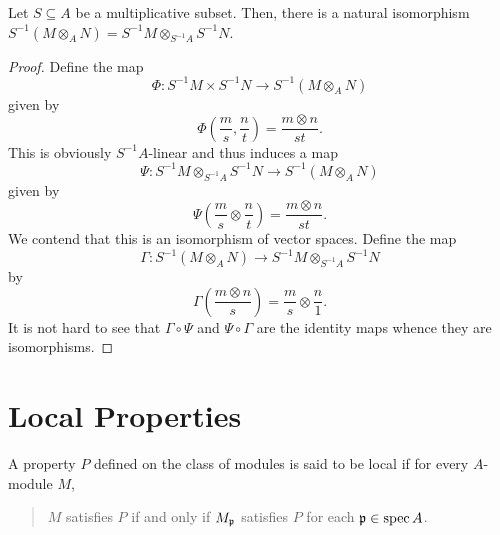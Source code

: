 \begin{proposition}
    Let $S\subseteq A$ be a multiplicative subset. Then, there is a natural isomorphism $S^{-1}(M\otimes_A N) = S^{-1}M\otimes_{S^{-1}A}S^{-1}N$.
\end{proposition}
\begin{proof}
    Define the map 
    \begin{equation*}
        \Phi: S^{-1}M\times S^{-1}N\to S^{-1}(M\otimes_A N) 
    \end{equation*}
    given by 
    \begin{equation*}
        \Phi\left(\frac{m}{s}, \frac{n}{t}\right) = \frac{m\otimes n}{st}.
    \end{equation*}
    This is obviously $S^{-1}A$-linear and thus induces a map 
    \begin{equation*}
        \Psi: S^{-1}M\otimes_{S^{-1}A} S^{-1}N\to S^{-1}(M\otimes_A N) 
    \end{equation*}
    given by 
    \begin{equation*}
        \Psi\left(\frac{m}{s}\otimes\frac{n}{t}\right) = \frac{m\otimes n}{st}.
    \end{equation*}
    We contend that this is an isomorphism of vector spaces. Define the map 
    \begin{equation*}
        \Gamma: S^{-1}(M\otimes_A N)\to S^{-1}M\otimes_{S^{-1}A} S^{-1}N
    \end{equation*}
    by 
    \begin{equation*}
        \Gamma\left(\frac{m\otimes n}{s}\right) = \frac{m}{s}\otimes\frac{n}{1}.
    \end{equation*}
    It is not hard to see that $\Gamma\circ\Psi$ and $\Psi\circ\Gamma$ are the identity maps whence they are isomorphisms.
\end{proof}

\section{Local Properties}

A property $P$ defined on the class of modules is said to be local if for every $A$-module $M$,
\begin{quotation}
    $M$ satisfies $P$ if and only if $M_\mathfrak p$ satisfies $P$ for each $\mathfrak p\in\operatorname{spec} A$.
\end{quotation}

